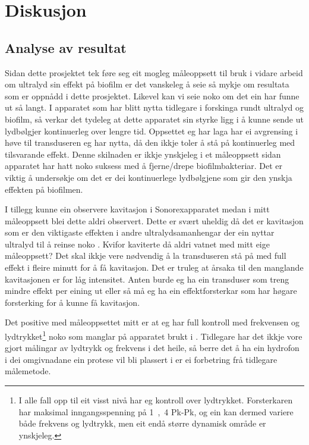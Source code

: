\section{Diskusjon}
\subsection{Analyse av resultat}
Sidan dette prosjektet tek føre seg eit mogleg måleoppsett til bruk i vidare arbeid om ultralyd sin effekt på biofilm er det vanskeleg å seie så mykje om resultata som er oppnådd i dette prosjektet. Likevel kan vi seie noko om det ein har funne ut så langt. I apparatet som har blitt nytta tidlegare i forskinga rundt ultralyd og biofilm, så verkar det tydeleg at dette apparatet sin styrke ligg i å kunne sende ut lydbølgjer kontinuerleg over lengre tid. Oppsettet eg har laga har ei avgrensing i høve til transduseren eg har nytta, då den ikkje toler å stå på kontinuerleg med tilsvarande effekt. Denne skilnaden er ikkje ynskjeleg i et måleoppsett sidan apparatet har hatt noko suksess med å fjerne/drepe biofilmbakteriar. Det er viktig å undersøkje om det er dei kontinuerlege lydbølgjene som gir den ynskja effekten på biofilmen. 

I tillegg kunne ein observere kavitasjon i Sonorexapparatet medan i mitt måleoppsett blei dette aldri observert. Dette er svært uheldig då det er kavitasjon som er den viktigaste effekten i andre ultralydsamanhengar der ein nyttar ultralyd til å reinse noko \cite{ultracleaning}. Kvifor kaviterte då aldri vatnet med mitt eige måleoppsett? Det skal ikkje vere nødvendig å la transduseren stå på med full effekt i fleire minutt for å få kavitasjon. Det er truleg at årsaka til den manglande kavitasjonen er for låg intensitet. Anten burde eg ha ein transduser som treng mindre effekt per eining ut eller så må eg ha ein effektforsterkar som har høgare forsterking for å kunne få kavitasjon.

Det positive med måleoppsettet mitt er at eg har full kontroll med frekvensen og lydtrykket\footnote{I alle fall opp til eit visst nivå har eg kontroll over lydtrykket. Forsterkaren har maksimal inngangsspenning på \unit{1,4}{\volt} Pk-Pk, og ein kan dermed variere både frekvens og lydtrykk, men eit endå større dynamisk område er ynskjeleg.} noko som manglar på apparatet brukt i \cite{ultraprotese}. Tidlegare har det ikkje vore gjort målingar av lydtrykk og frekvens i det heile, så berre det å ha ein hydrofon i dei omgivnadane ein protese vil bli plassert i er ei forbetring frå tidlegare målemetode.

